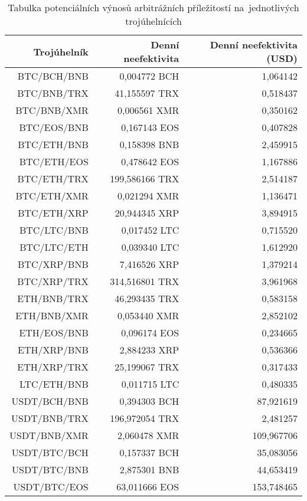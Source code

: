 \begin{table}\centering
\caption{Tabulka potenciálních výnosů arbitrážních příležitostí na~jednotlivých trojúhelnících}
\label{table_gains}
\begin{tabular}{|| r | r | r ||}\hline Trojúhelník & Denní neefektivita & Denní neefektivita (USD)\\ [0.5ex]
 \hline\hline BTC/BCH/BNB & 0,004772 BCH & 1,064142\\ 
 \hline BTC/BNB/TRX & 41,155597 TRX & 0,518437\\ 
 \hline BTC/BNB/XMR & 0,006561 XMR & 0,350162\\ 
 \hline BTC/EOS/BNB & 0,167143 EOS & 0,407828\\ 
 \hline BTC/ETH/BNB & 0,158398 BNB & 2,459915\\ 
 \hline BTC/ETH/EOS & 0,478642 EOS & 1,167886\\ 
 \hline BTC/ETH/TRX & 199,586166 TRX & 2,514187\\ 
 \hline BTC/ETH/XMR & 0,021294 XMR & 1,136471\\ 
 \hline BTC/ETH/XRP & 20,944345 XRP & 3,894915\\ 
 \hline BTC/LTC/BNB & 0,017452 LTC & 0,715520\\ 
 \hline BTC/LTC/ETH & 0,039340 LTC & 1,612920\\ 
 \hline BTC/XRP/BNB & 7,416526 XRP & 1,379214\\ 
 \hline BTC/XRP/TRX & 314,516801 TRX & 3,961968\\ 
 \hline ETH/BNB/TRX & 46,293435 TRX & 0,583158\\ 
 \hline ETH/BNB/XMR & 0,053440 XMR & 2,852102\\ 
 \hline ETH/EOS/BNB & 0,096174 EOS & 0,234665\\ 
 \hline ETH/XRP/BNB & 2,884233 XRP & 0,536366\\ 
 \hline ETH/XRP/TRX & 25,199067 TRX & 0,317433\\ 
 \hline LTC/ETH/BNB & 0,011715 LTC & 0,480335\\ 
 \hline USDT/BCH/BNB & 0,394303 BCH & 87,921619\\ 
 \hline USDT/BNB/TRX & 196,972054 TRX & 2,481257\\ 
 \hline USDT/BNB/XMR & 2,060478 XMR & 109,967706\\ 
 \hline USDT/BTC/BCH & 0,157337 BCH & 35,083056\\ 
 \hline USDT/BTC/BNB & 2,875301 BNB & 44,653419\\ 
 \hline USDT/BTC/EOS & 63,011666 EOS & 153,748465\\ 

\end{tabular}
\end{table}
